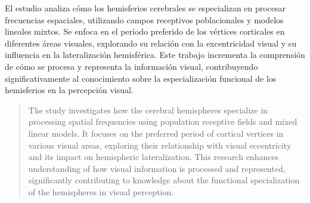 \begin{resumen}
	El estudio analiza cómo los hemisferios cerebrales se especializan en procesar frecuencias espaciales, utilizando campos receptivos poblacionales y modelos lineales mixtos. Se enfoca en el período preferido de los vértices corticales en diferentes áreas visuales, explorando su relación con la excentricidad visual y su influencia en la lateralización hemisférica. Este trabajo incrementa la comprensión de cómo se procesa y representa la información visual, contribuyendo significativamente al conocimiento sobre la especialización funcional de los hemisferios en la percepción visual.
\end{resumen}

\begin{abstract}
	The study investigates how the cerebral hemispheres specialize in processing spatial frequencies using population receptive fields and mixed linear models. It focuses on the preferred period of cortical vertices in various visual areas, exploring their relationship with visual eccentricity and its impact on hemispheric lateralization. This research enhances understanding of how visual information is processed and represented, significantly contributing to knowledge about the functional specialization of the hemispheres in visual perception.
\end{abstract}